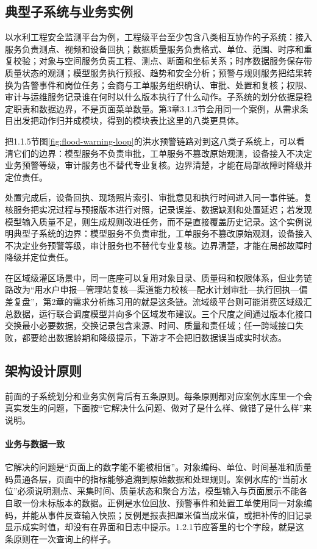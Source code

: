 \subsection{典型子系统与业务实例}

以水利工程安全监测平台为例，工程级平台至少包含八类相互协作的子系统：接入服务负责测点、视频和设备回执；数据质量服务负责格式、单位、范围、时序和重复校验；对象与空间服务负责工程、测点、断面和坐标关系；时序数据服务保存带质量状态的观测；模型服务执行预报、趋势和安全分析；预警与规则服务把结果转换为告警事件和岗位任务；会商与工单服务组织确认、审批、处置和复核；权限、审计与运维服务记录谁在何时以什么版本执行了什么动作。子系统的划分依据是稳定职责和数据边界，不是页面菜单数量。第3章3.1.3节会用同一个案例，从需求条目出发把动作归并成模块，得到的模块表比这里的八类更具体。

把1.1.5节图\ref{fig:flood-warning-loop}的洪水预警链路对到这八类子系统上，可以看清它们的边界：模型服务不负责审批，工单服务不篡改原始观测，设备接入不决定业务预警等级，审计服务也不替代专业复核。边界清楚，才能在局部故障时降级并定位责任。

处置完成后，设备回执、现场照片索引、审批意见和执行时间进入同一事件链。复核服务把实况过程与预报版本进行对照，记录误差、数据缺测和处置延迟；若发现模型输入质量不足，则生成规则改进任务，而不是直接覆盖历史记录。这个实例说明典型子系统的边界：模型服务不负责审批，工单服务不篡改原始观测，设备接入不决定业务预警等级，审计服务也不替代专业复核。边界清楚，才能在局部故障时降级并定位责任。


在区域级灌区场景中，同一底座可以复用对象目录、质量码和权限体系，但业务链路改为“用水户申报—管理站复核—渠道能力校核—配水计划审批—执行回执—偏差复盘”，第2章的需求分析练习用的就是这条链。流域级平台则可能消费区域级汇总数据，运行联合调度模型并向多个区域发布建议。三个尺度之间通过版本化接口交换最小必要数据，交换记录包含来源、时间、质量和责任域；任一跨域接口失败，都要给出数据龄期和降级提示，下游才不会把旧数据误当成实时状态。

\subsection{架构设计原则}

前面的子系统划分和业务实例背后有五条原则。每条原则都对应案例水库里一个会真实发生的问题，下面按“它解决什么问题、做对了是什么样、做错了是什么样”来说明。

\paragraph{业务与数据一致}
它解决的问题是“页面上的数字能不能被相信”。对象编码、单位、时间基准和质量码贯通各层，页面中的指标能够追溯到原始数据和处理规则。案例水库的“当前水位”必须说明测点、采集时间、质量状态和聚合方法，模型输入与页面展示不能各自取一份未标版本的数据。正例是水位回放、预警事件和处置工单使用同一对象编码，并能从事件反查输入快照；反例是报表把厘米值当成米值，或把补传的旧记录显示成实时值，却没有在界面和日志中提示。1.2.1节应答里的七个字段，就是这条原则在一次查询上的样子。

